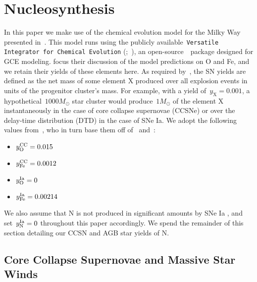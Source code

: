 \documentclass[ms.tex]{subfiles}
\begin{document}
\section{Nucleosynthesis}
\label{sec:yields}

In this paper we make use of the chemical evolution model for the Milky Way
presented in~\citet{Johnson2021}.
This model runs using the publicly available~\texttt{Versatile Integrator for
Chemical Evolution} (\vice;~\citealp{Johnson2020, Griffith2021, Johnson2021}),
an open-source~\python~package designed for GCE modeling.
\citet{Johnson2021} focus their discussion of the model predictions on O and
Fe, and we retain their yields of these elements here.
As required by~\vice, the SN yields are defined as the net mass of some element
X produced over all explosion events in units of the progenitor cluster's
mass.
For example, with a yield of~$y_\text{X} = 0.001$, a hypothetical~$1000 M_\odot$
star cluster would produce~$1 M_\odot$ of the element X instantaneously in the
case of core collapse supernovae (CCSNe) or over the delay-time distribution
(DTD) in the case of SNe Ia.
We adopt the following values from~\citet{Johnson2021}, who in turn base them
off of~\citet*{Weinberg2017} and~\citet{Johnson2020}:
\begin{itemize}
	\item $y_\text{O}^\text{CC} = 0.015$

	\item $y_\text{Fe}^\text{CC} = 0.0012$

	\item $y_\text{O}^\text{Ia} = 0$

	\item $y_\text{Fe}^\text{Ia} = 0.00214$
\end{itemize}
We also assume that N is not produced in significant amounts by SNe Ia
\citep{Johnson2019}, and set~$y_\text{N}^\text{Ia} = 0$ throughout this paper
accordingly.
We spend the remainder of this section detailing our CCSN and AGB star yields
of N.

\subsection{Core Collapse Supernovae and Massive Star Winds}
\label{sec:yields:ccsne}
\end{document}
